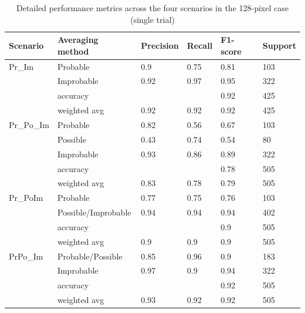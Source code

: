 \documentclass[Journal,letterpaper, SingleSpace, InsideFigs]{ascelike-new}
\begin{document}
\begin{table}[ht]\small
    \centering
\begin{tabular}{@{}llllll@{}}
\toprule
\textbf{Scenario} & \textbf{Averaging method} & \textbf{Precision} & \textbf{Recall} & \textbf{F1-score} & \textbf{Support} \\ \midrule
Pr\_Im    & Probable            & 0.9  & 0.75 & 0.81 & 103 \\
         & Improbable          & 0.92 & 0.97 & 0.95 & 322 \\
         & accuracy            &      &      & 0.92 & 425 \\
         & weighted avg        & 0.92 & 0.92 & 0.92 & 425 \\ \midrule
Pr\_Po\_Im & Probable            & 0.82 & 0.56 & 0.67 & 103 \\
         & Possible            & 0.43 & 0.74 & 0.54 & 80  \\
         & Improbable          & 0.93 & 0.86 & 0.89 & 322 \\
         & accuracy            &      &      & 0.78 & 505 \\
         & weighted avg        & 0.83 & 0.78 & 0.79 & 505 \\ \midrule
Pr\_PoIm  & Probable            & 0.77 & 0.75 & 0.76 & 103 \\
         & Possible/Improbable & 0.94 & 0.94 & 0.94 & 402 \\
         & accuracy            &      &      & 0.9  & 505 \\
         & weighted avg        & 0.9  & 0.9  & 0.9  & 505 \\ \midrule
PrPo\_Im  & Probable/Possible   & 0.85 & 0.96 & 0.9  & 183 \\
         & Improbable          & 0.97 & 0.9  & 0.94 & 322 \\
         & accuracy            &      &      & 0.92 & 505 \\
         & weighted avg        & 0.93 & 0.92 & 0.92 & 505 \\ \bottomrule
\end{tabular}
    \caption{Detailed performance metrics across the four scenarios in the 128-pixel case (single trial)}
    \label{tab:performance}
\end{table}


\end{document}
